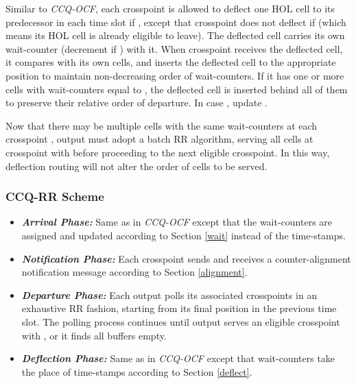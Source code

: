 \documentclass[journal,final,doublecolumn,10pt,twoside]{IEEEtranTCOM} \normalsize
\begin{document}
Similar to \emph{CCQ-OCF}, each crosspoint  is allowed to deflect one HOL cell to its predecessor  in each time slot if , except that crosspoint  does not deflect if  (which means its HOL cell is already eligible to leave). The deflected cell carries its own wait-counter  (decrement if ) with it. When crosspoint  receives the deflected cell, it compares  with its own cells, and inserts the deflected cell to the appropriate position to maintain non-decreasing order of wait-counters. If it has one or more cells with wait-counters equal to , the deflected cell is inserted behind all of them to preserve their relative order of departure. In case , update .

Now that there may be multiple cells with the same wait-counters at each crosspoint , output  must adopt a batch RR algorithm, serving all cells  at crosspoint  with  before proceeding to the next eligible crosspoint. In this way, deflection routing will not alter the order of cells to be served.


\subsubsection{CCQ-RR Scheme}
\begin{itemize}
\item \textbf{\emph{Arrival Phase:}} 
Same as in \emph{CCQ-OCF} except that the wait-counters are assigned and updated according to Section \ref{wait} instead of the time-stamps.

\item \textbf{\emph{Notification Phase:}} 
Each crosspoint  sends and receives a counter-alignment notification message according to Section \ref{alignment}.

\item \textbf{\emph{Departure Phase:}} 
Each output  polls its associated crosspoints  in an exhaustive RR fashion, starting from its final position  in the previous time slot. The polling process continues until output  serves an eligible crosspoint with , or it finds all buffers empty.

\item \textbf{\emph{Deflection Phase:}} 
Same as in \emph{CCQ-OCF} except that wait-counters take the place of time-stamps according to Section \ref{deflect}.
\end{itemize}
\end{document}
